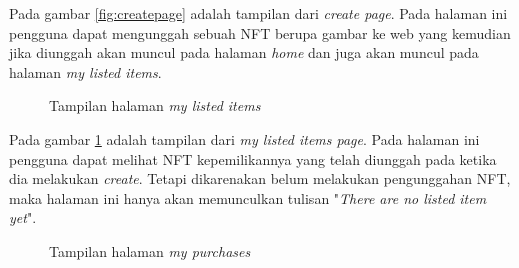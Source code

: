   Pada gambar \ref{fig:createpage} adalah tampilan dari \emph{create page}. Pada halaman ini pengguna dapat mengunggah sebuah NFT berupa gambar ke web yang kemudian jika diunggah akan muncul pada halaman \emph{home} dan juga akan muncul pada halaman \emph{my listed items}.

  \begin{figure} [H] \centering
    \caption{Tampilan halaman \emph{my listed items}}
    \label{fig:listingpage}
    \end{figure}
  
  Pada gambar \ref{fig:listingpage} adalah tampilan dari \emph{my listed items page}. Pada halaman ini pengguna dapat melihat NFT kepemilikannya yang telah diunggah pada ketika dia melakukan \emph{create}. Tetapi dikarenakan belum melakukan pengunggahan NFT, maka halaman ini hanya akan memunculkan tulisan "\emph{There are no listed item yet}".

  \begin{figure} [H] \centering
    \caption{Tampilan halaman \emph{my purchases}}
    \label{fig:purchasepage}
    \end{figure}
  
